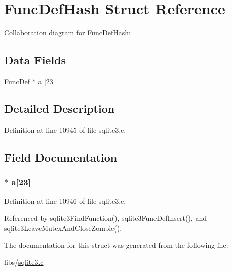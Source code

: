 \hypertarget{struct_func_def_hash}{}\section{Func\+Def\+Hash Struct Reference}
\label{struct_func_def_hash}


Collaboration diagram for Func\+Def\+Hash\+:
\subsection*{Data Fields}
\begin{DoxyCompactItemize}
\item 
\hyperlink{struct_func_def}{Func\+Def} $\ast$ \hyperlink{struct_func_def_hash_a9ab42ecb0532891a19b973639968205a}{a} \mbox{[}23\mbox{]}
\end{DoxyCompactItemize}


\subsection{Detailed Description}


Definition at line 10945 of file sqlite3.\+c.



\subsection{Field Documentation}
\hypertarget{struct_func_def_hash_a9ab42ecb0532891a19b973639968205a}{}
\subsubsection[{a}]{$\ast$ a\mbox{[}23\mbox{]}}\label{struct_func_def_hash_a9ab42ecb0532891a19b973639968205a}


Definition at line 10946 of file sqlite3.\+c.



Referenced by sqlite3\+Find\+Function(), sqlite3\+Func\+Def\+Insert(), and sqlite3\+Leave\+Mutex\+And\+Close\+Zombie().



The documentation for this struct was generated from the following file\+:\begin{DoxyCompactItemize}
\item 
libs/\hyperlink{sqlite3_8c}{sqlite3.\+c}\end{DoxyCompactItemize}
